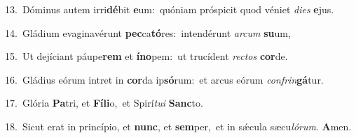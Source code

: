 {\numbfont\textcolor{\numbcolor}{13.}}~Dóminus autem irri\-\textbf{dé}\-bit \textbf{e}\-um:~\star quóniam próspicit quod véniet \textit{di}\-\textit{es} \textbf{e}\-jus.\par
{\numbfont\textcolor{\numbcolor}{14.}}~Gládium evaginavérunt \textbf{pec}\-ca\-\textbf{tó}\-res:~\star intendérunt \textit{ar}\-\textit{cum} \textbf{su}\-um,\par
{\numbfont\textcolor{\numbcolor}{15.}}~Ut dejíciant páupe\textbf{rem} et \textbf{ín}\-\textbf{o}pem:~\star ut trucídent \textit{rec}\-\textit{tos} \textbf{cor}\-de.\par
{\numbfont\textcolor{\numbcolor}{16.}}~Gládius eórum intret in \textbf{cor}\-da ip\-\textbf{só}\-rum:~\star et arcus eórum \textit{con}\-\textit{frin}\textbf{gá}tur.\par
{\numbfont\textcolor{\numbcolor}{17.}}~Glória \textbf{Pa}\-tri, et \textbf{Fí}\-\textbf{li}o,~\star et Spirí\-\textit{tu}\-\textit{i} \textbf{Sanc}\-to.\par
{\numbfont\textcolor{\numbcolor}{18.}}~Sicut erat in princípio, et \textbf{nunc}\-, et \textbf{sem}\-per,~\star et in sǽcula sæcu\-\textit{ló}\-\textit{rum}. \textbf{A}\-men.\par
